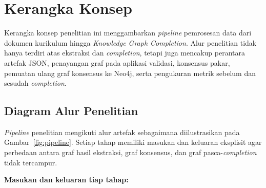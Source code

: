 \documentclass[../../thesis]{subfiles}
\begin{document}
\section{Kerangka Konsep}\label{subsec:kerangka-konsep}

Kerangka konsep penelitian ini menggambarkan \textit{pipeline}
pemrosesan data dari dokumen kurikulum hingga \textit{Knowledge Graph
Completion}. Alur penelitian tidak hanya terdiri atas ekstraksi dan
\textit{completion}, tetapi juga mencakup perantara artefak JSON,
penayangan graf pada aplikasi validasi, konsensus pakar, pemuatan ulang
graf konsensus ke Neo4j, serta pengukuran metrik sebelum dan sesudah
\textit{completion}.

\subsection{Diagram Alur Penelitian}

\textit{Pipeline} penelitian mengikuti alur artefak sebagaimana
diilustrasikan pada Gambar~\ref{fig:pipeline}. Setiap tahap memiliki
masukan dan keluaran eksplisit agar perbedaan antara graf hasil
ekstraksi, graf konsensus, dan graf pasca-\textit{completion} tidak
tercampur.



\noindent\textbf{Masukan dan keluaran tiap tahap:}
\end{document}

